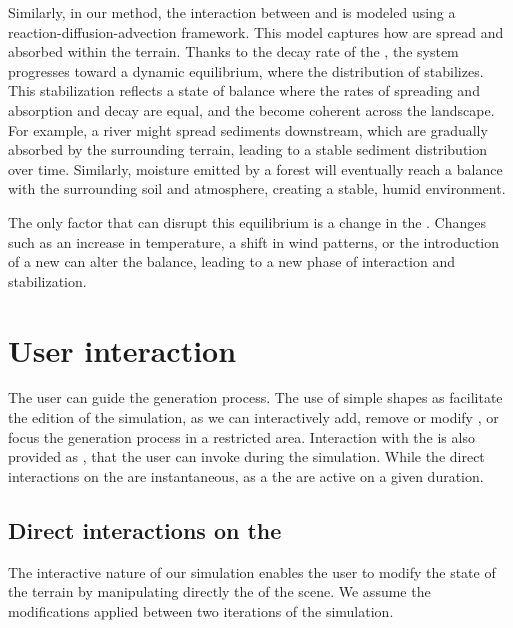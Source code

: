 Similarly, in our method, the interaction between  and  is modeled using a reaction-diffusion-advection framework. This model captures how  are spread and absorbed within the terrain. Thanks to the decay rate of the , the system progresses toward a dynamic equilibrium, where the distribution of  stabilizes. This stabilization reflects a state of balance where the rates of spreading and absorption and decay are equal, and the  become coherent across the landscape. For example, a river might spread sediments downstream, which are gradually absorbed by the surrounding terrain, leading to a stable sediment distribution over time. Similarly, moisture emitted by a forest will eventually reach a balance with the surrounding soil and atmosphere, creating a stable, humid environment.

The only factor that can disrupt this equilibrium is a change in the . Changes such as an increase in temperature, a shift in wind patterns, or the introduction of a new  can alter the balance, leading to a new phase of interaction and stabilization.


\section{User interaction}
\label{sec:semantic-representation_interaction}
The user can guide the generation process. The use of simple shapes as  facilitate the edition of the simulation, as we can interactively add, remove or modify , or focus the generation process in a restricted area. Interaction with the  is also provided as , that the user can invoke during the simulation. While the direct interactions on the  are instantaneous, as a the  are active on a given duration.

\subsection{Direct interactions on the }
\label{sec:semantic-representation_manual-interaction}
The interactive nature of our simulation enables the user to modify the state of the terrain by manipulating directly the  of the scene. We assume the modifications applied between two iterations of the simulation.

